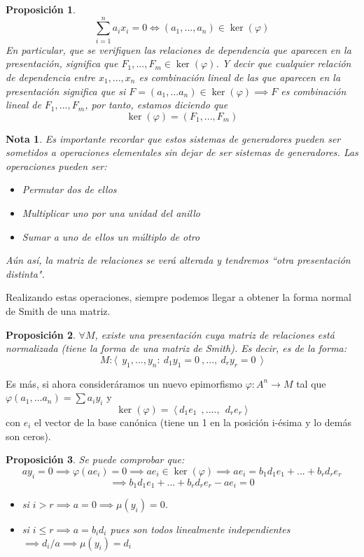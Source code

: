 \documentclass[11pt, a4paper, titlepage]{article}
\newif\IfInSansMode
\theoremstyle{theorem-style}
\newtheorem{nprop}{Proposición}[section]
\theoremstyle{definition-style}
\theoremstyle{remark-style}
\newtheorem*{nota}{Nota}
\theoremstyle{example-style}
\begin{document}
\begin{nprop}
	\[
	\sum_{i=1}^n a_i x_i  = 0 \iff (a_1,...,a_n) \in \ker(\varphi)
	\]
	En particular, que se verifiquen las relaciones de dependencia que aparecen en la presentación, significa que $F_1,...,F_m \in \ker(\varphi)$.
	Y decir que cualquier relación de dependencia entre $x_1,...,x_n$ es combinación lineal de las que aparecen en la presentación significa que si $F=(a_1,...a_n) \in \ker(\varphi) \implies F$ es combinación lineal de $F_1,...,F_m$, por tanto, estamos diciendo que
	\[
	\ker(\varphi) = (F_1,...,F_m)
	\]
\end{nprop}

\begin{nota}
	Es importante recordar que estos sistemas de generadores pueden ser sometidos a operaciones elementales sin dejar de ser sistemas de generadores. Las operaciones pueden ser:
	\begin{itemize}
	\item Permutar dos de ellos
	\item Multiplicar uno por una unidad del anillo
	\item Sumar a uno de ellos un múltiplo de otro
\end{itemize}
Aún así, la matriz de relaciones se verá alterada y tendremos “otra presentación distinta".
\end{nota}

Realizando estas operaciones, siempre podemos llegar a obtener la forma normal de Smith de una matriz.

\begin{nprop}
	$\forall M $, existe una presentación cuya matriz de relaciones está normalizada (tiene la forma de una matriz de Smith). Es decir, es de la forma:
	\[
	M : \langle \ \  y_1,...,y_n : \ d_1y_1 = 0 \ ,..., \ d_ry_r = 0 \ \  \rangle
	\]

\end{nprop}
Es más, si ahora consideráramos un nuevo epimorfismo $\varphi: A^n \to M$ tal que $\varphi (a_1,...a_n) = \sum a_i y_i$ y
\[
\ker(\varphi)= \ \langle\  d_1e_1 \ \ , .... , \ \ d_r e_r \ \rangle
\]
con $e_i$ el vector de la base canónica (tiene un 1 en la posición i-ésima y lo demás son ceros).

\begin{nprop}
	Se puede comprobar que:
	\[
	ay_i = 0 \implies \varphi (ae_i) = 0 \implies ae_i \in \ker(\varphi) \implies ae_i = b_1d_1e_1+...+b_rd_re_r
	\]
	\[
	\implies b_1d_1e_1+...+b_rd_re_r - ae_i = 0
	\]
	\begin{itemize}
	\item  si $i>r \implies a = 0 \implies \mu(y_i) = 0$.
	\item si $i \leq r \implies a = b_id_i$ pues son todos linealmente independientes $\implies d_i/a \implies \mu(y_i) = d_i$
\end{itemize}
\end{nprop}
\end{document}
